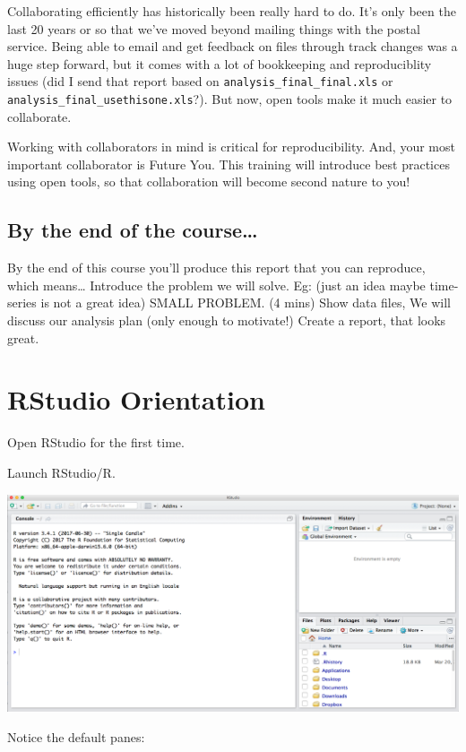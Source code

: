\documentclass[]{book}
\begin{document}
Collaborating efficiently has historically been really hard to do. It's only been the last 20 years or so that we've moved beyond mailing things with the postal service. Being able to email and get feedback on files through track changes was a huge step forward, but it comes with a lot of bookkeeping and reproduciblity issues (did I send that report based on \texttt{analysis\_final\_final.xls} or \texttt{analysis\_final\_usethisone.xls}?). But now, open tools make it much easier to collaborate.

Working with collaborators in mind is critical for reproducibility. And, your most important collaborator is Future You. This training will introduce best practices using open tools, so that collaboration will become second nature to you!

\hypertarget{by-the-end-of-the-course}{%
\subsection{By the end of the course\ldots{}}\label{by-the-end-of-the-course}}

By the end of this course you'll produce this report that you can reproduce, which means\ldots{}
Introduce the problem we will solve. Eg: (just an idea maybe time-series is not a great idea) SMALL PROBLEM. (4 mins)
Show data files, We will discuss our analysis plan (only enough to motivate!) Create a report, that looks great.

\hypertarget{rstudio-orientation}{%
\section{RStudio Orientation}\label{rstudio-orientation}}

Open RStudio for the first time.

Launch RStudio/R.

\includegraphics[width=0.8\linewidth]{img/RStudio_IDE}

Notice the default panes:
\end{document}
